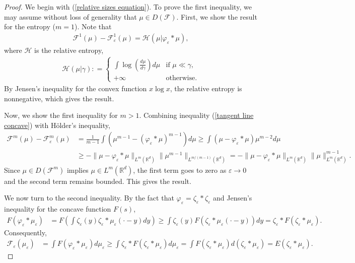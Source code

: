 \documentclass[11pt,leqno]{amsart}
\theoremstyle{definition}
\newcommand{\Rd}{{\mathord{\mathbb R}^d}}
\newcommand{\F}{\mathcal{F}}
\def\e{\varepsilon}
\def\F{\mathcal{F}}
\begin{document}
\begin{proof}
We begin with (\ref{relative sizes equation}). To prove the first inequality, we may assume without loss of generality that $\mu \in D(\F)$.
First, we show the result for the entropy ($m=1$). Note that
\begin{align} \label{relative entropy relation} \F^1(\mu)-\F^1_\e(\mu) =  \mathcal{H}(\mu | \varphi_\e *\mu) ,\end{align} where $\mathcal{H}$ is the relative entropy,
\begin{align*}
 \mathcal{H}(\mu | \gamma) : = \begin{cases} \int \log \left( \frac{d \mu}{d \gamma} \right) d \mu &\text{if } \mu \ll \gamma, \\ + \infty &\text{otherwise.}\end{cases}
\end{align*}
By Jensen's inequality for the convex function $x \log x$,  the relative entropy
is nonnegative, which gives the result.

Now, we show the first inequality for $m>1$. Combining inequality (\ref{tangent line  concave}) with H\"older's inequality,
\begin{align*}
\F^m(\mu) - \F^m_\e(\mu) &= \frac{1}{m-1} \int \left( \mu^{m-1} - (\varphi_\e*\mu)^{m-1} \right) d \mu \geq \int \left(\mu - \varphi_\e*\mu \right) \mu^{m-2} d \mu 
\\ 
&\geq - \|\mu - \varphi_\e* \mu\|_{L^m(\Rd)} \|\mu^{m-1}\|_{L^{m/(m-1)}(\Rd)} = - \|\mu - \varphi_\e* \mu\|_{L^m(\Rd)} \|\mu\|_{L^m(\Rd)}^{m-1} .
\end{align*}
Since $\mu \in D(\F^m)$ implies $\mu \in L^m(\Rd)$, the first term goes to zero as $\e \to 0$ and the second term remains bounded. This gives the result.


We now turn to the second inequality. By the fact that $\varphi_\e = \zeta_\e * \zeta_\e$ and Jensen's inequality for the concave function $F(s)$,
\begin{align} \label{rel size ineq1}
 F(\varphi_\e * \mu_\e) &= 
 F \left( \int \zeta_\e(y) \zeta_\e*\mu_\e(\cdot-y) dy \right)  \geq   \int \zeta_\e(y) F \left(\zeta_\e*\mu_\e(\cdot-y) \right) dy   =   \zeta_\e* F \left(\zeta_\e*\mu_\e \right).
\end{align}
Consequently,
\begin{align} \label{rel size ineq2}
\F_\e(\mu_\e) &= \int F(\varphi_\e * \mu_\e) d \mu_\e \geq   \int \zeta_\e*  F \left(\zeta_\e*\mu_\e \right)  d \mu_\e  = \int   F \left(\zeta_\e*\mu_\e \right)  d (\zeta_\e*\mu_\e) = E \left( \zeta_\e*\mu_\e  \right) .
\end{align}


\end{proof}
\end{document}
